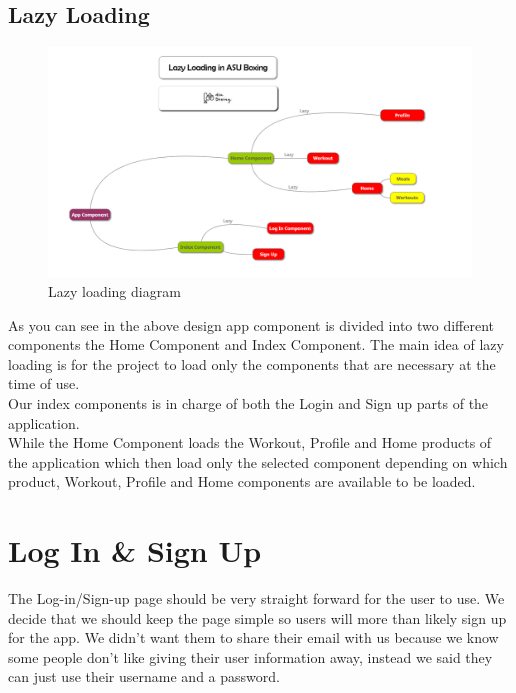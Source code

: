 \documentclass[a4paper,12pt]{report}
\begin{document}
\subsection{Lazy Loading}
\begin{figure}[h]
\includegraphics[scale=.5]{images/Lazy-Loading(4).PNG}
\caption{Lazy loading diagram}
\label{fig:LazyLoading}
\end{figure}
\newpage
As you can see in the above design app component is divided into two different components the Home Component and Index Component.
The main idea of lazy loading is for the project to load only the components that are necessary at the time of use. \\
Our index components is in charge of both the Login and Sign up parts of the application.\\
While the Home Component loads the Workout, Profile and Home products of the application which then load only the selected component depending on which product, Workout, Profile and Home components are available to be loaded. 

\section{Log In \& Sign Up}
The Log-in/Sign-up page should be very straight forward for the user to use. We decide that we should keep the page simple so users will more than likely sign up for the app. We didn't want them to share their email with us because we know some people don't like giving their user information away, instead we said they can just use their username and a password.
\end{document}
